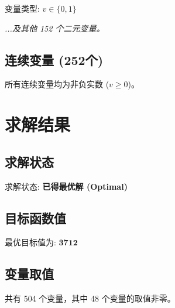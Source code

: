 \documentclass[a4paper,10pt]{article}
\begin{document}
变量类型: $v \in \{0,1\}$

\textit{...及其他 152 个二元变量。}

\subsection{连续变量 (252个)}

所有连续变量均为非负实数 ($v \geq 0$)。

\section{求解结果}

\subsection{求解状态}

求解状态: \textbf{已得最优解 (Optimal)}

\subsection{目标函数值}

最优目标值为: $\mathbf{3712}$

\subsection{变量取值}

共有 504 个变量，其中 48 个变量的取值非零。
\end{document}
